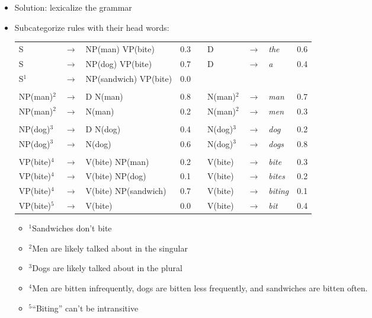 \documentclass[11pt,letterpaper]{article}
\newcommand{\ra}{\ensuremath{\rightarrow}}
\begin{document}
\begin{itemize}
\begin{small}
    \end{small}
  \item Solution: lexicalize the grammar
  \item Subcategorize rules with their head words:
	\begin{center}
	\begin{tabular}{llll p{18mm} llll}
	  S  & $\ra$ & NP(man) VP(bite)            &  0.3  &&  D & $\ra$ & \textit{the}        & 0.6 \\
	  S  & $\ra$ & NP(dog) VP(bite)            &  0.7  &&  D & $\ra$ & \textit{a}          & 0.4 \\
	  S$^1$  & $\ra$ & NP(sandwich) VP(bite)       &  0.0  &&    &       &                     &     \\
	     &       &                             &       &&    &       &                     &     \\
	  NP(man)$^2$ & $\ra$ & D N(man)               &  0.8  &&  N(man)$^2$ & $\ra$ & \textit{man}   & 0.7 \\
	  NP(man)$^2$ & $\ra$ & N(man)                 &  0.2  &&  N(man)$^2$ & $\ra$ & \textit{men}   & 0.3 \\
	     &       &                             &       &&    &       &                     &     \\
	  NP(dog)$^3$ & $\ra$ & D N(dog)               &  0.4  &&  N(dog)$^3$ & $\ra$ & \textit{dog}   & 0.2 \\
	  NP(dog)$^3$ & $\ra$ & N(dog)                 &  0.6  &&  N(dog)$^3$ & $\ra$ & \textit{dogs}  & 0.8 \\
	     &       &                             &       &&    &       &                     &     \\
	  VP(bite)$^4$ & $\ra$ & V(bite) NP(man)       &  0.2  &&  V(bite) & $\ra$ & \textit{bite}    & 0.3 \\
	  VP(bite)$^4$ & $\ra$ & V(bite) NP(dog)       &  0.1  &&  V(bite) & $\ra$ & \textit{bites}   & 0.2 \\
	  VP(bite)$^4$ & $\ra$ & V(bite) NP(sandwich)  &  0.7  &&  V(bite) & $\ra$ & \textit{biting}  & 0.1 \\
	  VP(bite)$^5$ & $\ra$ & V(bite)               &  0.0  &&  V(bite) & $\ra$ & \textit{bit}     & 0.4 \\
	\end{tabular}
	\end{center}
  \begin{itemize}
    \item {}$^1$Sandwiches don't bite
    \item {}$^2$Men are likely talked about in the singular
    \item {}$^3$Dogs are likely talked about in the plural
    \item {}$^4$Men are bitten infrequently, dogs are bitten less frequently, and sandwiches are bitten often.
    \item {}$^5$``Biting'' can't be intransitive
  \end{itemize}


\end{itemize}
\end{document}
